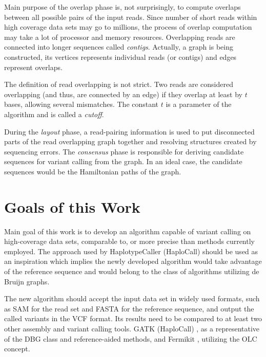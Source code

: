 Main purpose of the overlap phase is, not surprisingly, to compute overlaps between all possible pairs of the input reads. Since number of short reads within high coverage data sets may go to millions, the process of overlap computation may take a lot of processor and memory resources. Overlapping reads are connected into longer sequences called \textit{contigs}. Actually, a graph is being constructed, its vertices represents individual reads (or contigs) and edges represent overlaps. 

The definition of read overlapping is not strict. Two reads are considered overlapping (and thus, are connected by an edge) if they overlap at least by $t$ bases, allowing several mismatches. The constant $t$ is a parameter of the algorithm and is called a \textit{cutoff}. 

During the \textit{layout} phase, a read-pairing information is used to put disconnected parts of the read overlapping graph together and resolving structures created by sequencing errors. The \textit{consensus} phase is responsible for deriving candidate sequences for variant calling from the graph. In an ideal case, the candidate sequences would be the Hamiltonian paths of the graph. 

\section{Goals of this Work} 
\label{sec:goals-of-this-work} 

Main goal of this work is to develop an algorithm capable of variant calling on high-coverage data sets, comparable to, or more precise than methods currently employed. The approach used by HaplotypeCaller (HaploCall) should be used as an inspiration which implies the newly developed algorithm would take advantage of the reference sequence and would belong to the class of algorithms utilizing de Bruijn graphs. 

The new algorithm should accept the input data set in widely used formats, such as SAM for the read set and FASTA for the reference sequence, and output the called variants in the VCF format\cite{vcf-format}. Its results need to be compared to at least two other assembly and variant calling tools. GATK (HaploCall) \cite{haplocall}, as a representative of the DBG class and reference-aided methods, and Fermikit \cite{fermikit}, utilizing the OLC concept.